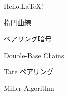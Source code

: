 \documentclass[uplatex]{jsarticle}
\begin{document}
Hello,\LaTeX!
\item 楕円曲線
\item ペアリング暗号
\item Double-Base Chains
\item Tate  ペアリング
\item Miller Algorithm
\end{document}
